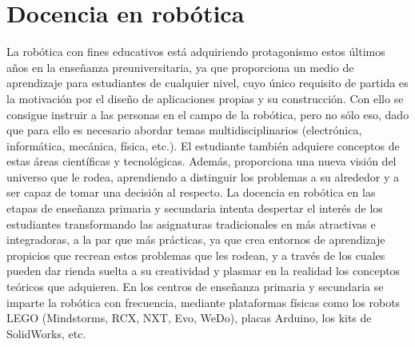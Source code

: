 \section{Docencia en robótica}
La robótica con fines educativos está adquiriendo protagonismo estos últimos años en la enseñanza preuniversitaria, ya que proporciona un medio de aprendizaje para estudiantes de cualquier nivel, cuyo único requisito de partida es la motivación por el diseño de aplicaciones propias y su construcción. Con ello se consigue instruir a las personas en el campo de la robótica, pero no sólo eso, dado que para ello es necesario abordar temas multidisciplinarios (electrónica, informática, mecánica, física, etc.). El estudiante también adquiere conceptos de estas áreas científicas y tecnológicas. Además, proporciona una nueva visión del universo que le rodea, aprendiendo a distinguir los problemas  a su alrededor y a ser capaz de tomar una decisión al respecto.
La docencia en robótica en las etapas de enseñanza primaria y secundaria intenta despertar el interés de los estudiantes transformando las asignaturas tradicionales en más atractivas e integradoras, a la par que más prácticas, ya que crea entornos de aprendizaje propicios que recrean estos problemas que les rodean, y a través de los cuales pueden dar rienda suelta a su creatividad y plasmar en la realidad los conceptos teóricos que adquieren.
En los centros de enseñanza primaria y secundaria se imparte la robótica con frecuencia, mediante plataformas físicas como los robots LEGO (Mindstorms, RCX, NXT, Evo, WeDo), placas Arduino, los kits de SolidWorks, etc. 

